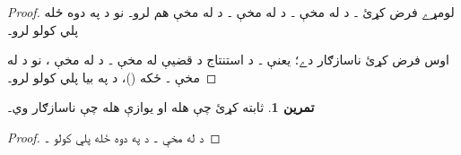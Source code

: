 \documentclass[12pt,a4paper,oneside]{report}
\gdef\pspart{#2}\gdef\pschapter{#3}\gdef\pssection{}%
\newcommand{\ollabel}[1]{\label{\pspart:\pschapter:\pssection:#1}}
\newtheorem{prop}[thm]{قضيه}
\theoremstyle{definition}
\newtheorem{prob}[thm]{تمرين}
\begin{document}
\label{olpseg:OLP-0121-B010:start}
\begin{proof}
لومړے فرض کړئ ۔ د
 له مخې
۔ د
 له مخې
۔ د
 له مخې
 هم لرو۔ نو د
 په دوه ځله پلي کولو
 لرو۔
\label{olpseg:OLP-0121-B010:end}

\label{olpseg:OLP-0121-B011:start}
اوس فرض کړئ  ناسازګار دے؛ يعنې
۔ د استنتاج د قضیې له
مخې ۔ د
 له مخې
، نو
د  له مخې ۔
ځکه 
()، د  په بيا پلي کولو
 لرو۔
\end{proof}
\label{olpseg:OLP-0121-B011:end}

\label{olpseg:OLP-0121-B012:start}
\begin{prob}
ثابته کړئ چې  هله او يوازې هله چې
 ناسازګار وي۔
\end{prob}
\label{olpseg:OLP-0121-B012:end}

\label{olpseg:OLP-0121-B013:start}
\label{olpseg:OLP-0121-B013:end}

\label{olpseg:OLP-0121-B014:start}
\begin{proof}
  د  له مخې
  ۔ د
   په دوه ځله پلي کولو
  \LR{$\Gamma \Proves \lfalse$}۔
\end{proof}
\label{olpseg:OLP-0121-B014:end}

\label{olpseg:OLP-0121-B015:start}
\label{olpseg:OLP-0121-B015:end}
\end{document}
